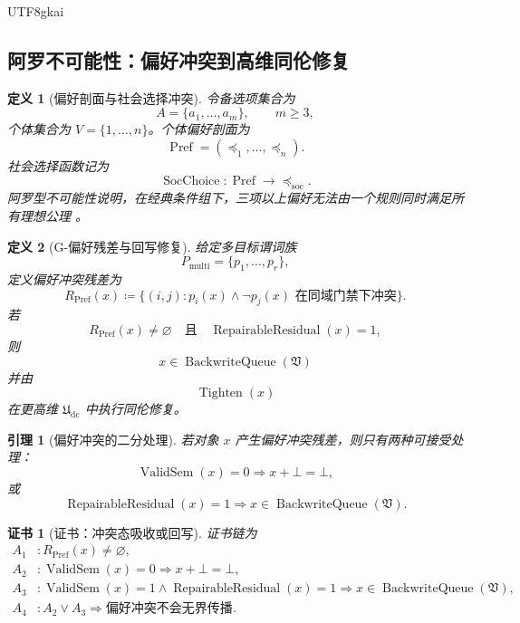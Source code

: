 \documentclass[12pt]{article}
\newtheorem{definition}{定义}[section]
\newtheorem{lemma}{引理}[section]
\newtheorem{Certificate}{证书}[section]
\newcommand{\Udc}{\mathfrak{U}_{\mathrm{dc}}}
\newcommand{\Vsys}{\mathfrak V}
\newcommand{\DefEq}{\coloneqq}
\DeclareMathOperator{\BackwriteQueue}{BackwriteQueue}
\DeclareMathOperator{\Tighten}{Tighten}
\DeclareMathOperator{\ValidSem}{ValidSem}
\DeclareMathOperator{\RepairableResidual}{RepairableResidual}
\DeclareMathOperator{\Pref}{Pref}
\DeclareMathOperator{\SocChoice}{SocChoice}
\begin{document}
\begin{CJK*}{UTF8}{gkai}
\subsection{阿罗不可能性：偏好冲突到高维同伦修复}
\label{subsec:tex59-arrow-social-choice}

\begin{definition}[偏好剖面与社会选择冲突]
\label{def:tex59-preference-profile}
令备选项集合为
\[
  A=\{a_1,\ldots,a_m\},
  \qquad m\ge3,
\]
个体集合为 \(V=\{1,\ldots,n\}\)。个体偏好剖面为
\[
  \Pref
  =
  (\preceq_1,\ldots,\preceq_n).
\]
社会选择函数记为
\[
  \SocChoice:\Pref\to\preceq_{\mathrm{soc}}.
\]
阿罗型不可能性说明，在经典条件组下，三项以上偏好无法由一个规则同时满足所有理想公理
\cite{Arrow1951SocialChoice,Sen1970CollectiveChoice}。
\end{definition}

\begin{definition}[G-偏好残差与回写修复]
\label{def:tex59-preference-residual}
给定多目标谓词族
\[
  P_{\mathrm{multi}}
  =
  \{p_1,\ldots,p_r\},
\]
定义偏好冲突残差为
\[
  R_{\Pref}(x)
  \DefEq
  \{(i,j):p_i(x)\wedge\neg p_j(x)\text{ 在同域门禁下冲突}\}.
\]
若
\[
  R_{\Pref}(x)\ne\varnothing
  \quad\text{且}\quad
  \RepairableResidual(x)=1,
\]
则
\[
  x\in\BackwriteQueue(\Vsys)
\]
并由
\[
  \Tighten(x)
\]
在更高维 \(\Udc\) 中执行同伦修复。
\end{definition}

\begin{lemma}[偏好冲突的二分处理]
\label{lem:tex59-preference-conflict-dichotomy}
若对象 \(x\) 产生偏好冲突残差，则只有两种可接受处理：
\[
  \ValidSem(x)=0
  \Rightarrow
  x+\bot=\bot,
\]
或
\[
  \RepairableResidual(x)=1
  \Rightarrow
  x\in\BackwriteQueue(\Vsys).
\]
\end{lemma}

\begin{Certificate}[证书：冲突态吸收或回写]
\label{cert:tex59-preference-conflict-dichotomy}
证书链为
\[
\begin{aligned}
  A_1 &: R_{\Pref}(x)\ne\varnothing,\\
  A_2 &: \ValidSem(x)=0
       \Rightarrow x+\bot=\bot,\\
  A_3 &: \ValidSem(x)=1\wedge \RepairableResidual(x)=1
       \Rightarrow x\in\BackwriteQueue(\Vsys),\\
  A_4 &: A_2\vee A_3
       \Rightarrow \text{偏好冲突不会无界传播}.
\end{aligned}
\]
\end{Certificate}


\end{CJK*}
\end{document}
